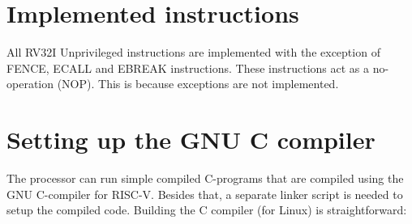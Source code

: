 \documentclass[12pt]{article}
\begin{document}
\section{Implemented instructions}
All RV32I Unprivileged instructions are implemented with the exception of FENCE, ECALL and EBREAK instructions. These instructions act as a no-operation (NOP). This is because exceptions are not implemented.

\section{Setting up the GNU C compiler}
The processor can run simple compiled C-programs that are compiled using the GNU C-compiler for RISC-V. Besides that, a separate linker script is needed to setup the compiled code. Building the C compiler (for Linux) is straightforward:
\end{document}
